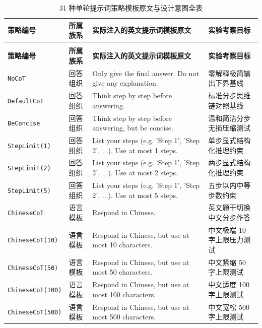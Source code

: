 {\setlength{\parfillskip}{0pt plus 1fil}
\ReportTableStyle
\begin{longtable}{@{}>{\raggedright\arraybackslash}p{3.0cm} >{\raggedright\arraybackslash}p{1.9cm} >{\raggedright\arraybackslash}p{5.5cm} >{\raggedright\arraybackslash}p{4.0cm}@{}}
\caption{31 种单轮提示词策略模板原文与设计意图全表}\label{tab:app-b-prompts31}\\
\toprule
\textbf{策略编号} & \textbf{所属族系} & \textbf{实际注入的英文提示词模板原文} & \textbf{实验考察目标} \\
\midrule
\endfirsthead
\multicolumn{4}{@{}l}{\fontsize{10bp}{12bp}\selectfont 表~\ref{tab:app-b-prompts31}（续）：31 种单轮提示词策略字典} \\
\toprule
\textbf{策略编号} & \textbf{所属族系} & \textbf{实际注入的英文提示词模板原文} & \textbf{实验考察目标} \\
\midrule
\endhead
\bottomrule
\endfoot
\texttt{NoCoT} & 回答组织 & Only give the final answer. Do not give any explanation. & 零解释极简输出下界基线 \\
\texttt{DefaultCoT} & 回答组织 & Think step by step before answering. & 标准分步思维链对照基线 \\
\texttt{BeConcise} & 回答组织 & Think step by step before answering, but be concise. & 温和简洁分步无损压缩测试 \\
\texttt{StepLimit(1)} & 回答组织 & List your steps (e.g. 'Step 1', 'Step 2', ...). Use at most 1 steps. & 单步显式结构化推理约束 \\
\texttt{StepLimit(2)} & 回答组织 & List your steps (e.g. 'Step 1', 'Step 2', ...). Use at most 2 steps. & 两步显式结构化推理约束 \\
\texttt{StepLimit(5)} & 回答组织 & List your steps (e.g. 'Step 1', 'Step 2', ...). Use at most 5 steps. & 五步以内中等步数约束 \\
\texttt{ChineseCoT} & 语言模板 & Respond in Chinese. & 英文题干切换中文分步作答 \\
\texttt{ChineseCoT(10)} & 语言模板 & Respond in Chinese, but use at most 10 characters. & 中文极端 10 字上限压力测试 \\
\texttt{ChineseCoT(50)} & 语言模板 & Respond in Chinese, but use at most 50 characters. & 中文紧缩 50 字上限测试 \\
\texttt{ChineseCoT(100)} & 语言模板 & Respond in Chinese, but use at most 100 characters. & 中文适度 100 字上限测试 \\
\texttt{ChineseCoT(500)} & 语言模板 & Respond in Chinese, but use at most 500 characters. & 中文宽松 500 字上限测试 \\

\end{longtable}}
